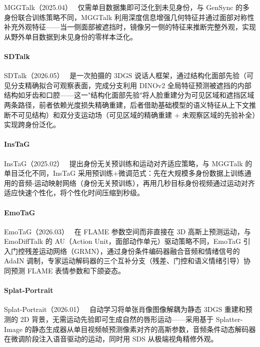 MGGTalk（2025.04）~\cite{2504_00665} 仅需单目数据集即可泛化到未见身份，与 GenSync 的多身份联合训练策略不同，MGGTalk 利用深度信息增强几何特征并通过面部对称性补充外观特征——当一侧面部被遮挡时，镜像另一侧的特征来推断完整外观，实现从野外单目数据到未见身份的零样本泛化。

\paragraph{SDTalk}

SDTalk（2026.05）~\cite{2605_09956} 是一次拍摄的 3DGS 说话人框架，通过结构化面部先验（可见分支精确拟合可观察表面，完成分支利用 DINOv2 全局特征预测被遮挡的内部结构如牙齿和口腔——这一"结构化面部先验"将人脸重建分为可见区域和遮挡区域两条路径，前者依赖光度损失精确重建，后者借助基础模型的语义特征从上下文推断不可见结构）和双分支运动场（可见区域的精确重建 + 未观察区域的先验补全）实现跨身份泛化。

\paragraph{InsTaG}

InsTaG（2025.02）~\cite{2502_20387} 提出身份无关预训练和运动对齐适应策略，与 MGGTalk 的单目泛化不同，InsTaG 采用预训练+微调范式：先在大规模多身份数据上训练通用的音频-运动映射网络（身份无关预训练），再用几秒目标身份视频通过运动对齐适应快速个性化，将个性化时间压缩到秒级。

\paragraph{EmoTaG}

EmoTaG（2026.03）~\cite{2603_21332} 在 FLAME 参数空间而非直接在 3D 高斯上预测运动，与 EmoDiffTalk 的 AU（Action Unit，面部动作单元）驱动策略不同，EmoTaG 引入门控残差运动网络（GRMN），通过身份条件编码器融合音频和情绪信号的 AdaIN 调制，专家运动解码器的三个互补分支（残差、门控和语义情绪引导）协同预测 FLAME 表情参数和下颌姿态。

\paragraph{Splat-Portrait}

Splat-Portrait（2026.01）~\cite{2601_18633} 自动学习将单张肖像图像解耦为静态 3DGS 重建和预测的 2D 背景，无需运动先验即可生成自然的唇形运动——采用基于 Splatter-Image 的静态生成器从单目视频帧预测像素对齐的高斯参数，音频条件动态解码器在微调阶段注入语音驱动的运动，同时用 SDS 从极端视角精修外观。

